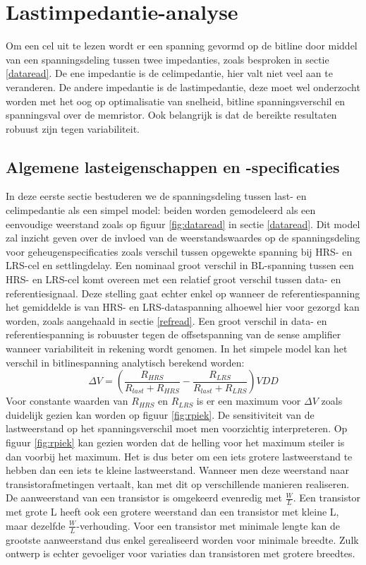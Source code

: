 \chapter{Lastimpedantie-analyse}
\label{loadanalysis}
Om een cel uit te lezen wordt er een spanning gevormd op de bitline door middel van een spanningsdeling tussen twee impedanties, zoals besproken in sectie \ref{dataread}. De ene impedantie is de celimpedantie, hier valt niet veel aan te veranderen. De andere impedantie is de lastimpedantie, deze moet wel onderzocht worden met het oog op optimalisatie van snelheid, bitline spanningsverschil en spanningsval over de memristor.
Ook belangrijk is dat de bereikte resultaten robuust zijn tegen variabiliteit.

\section{Algemene lasteigenschappen en -specificaties}\label{sec:simplemodel}
In deze eerste sectie bestuderen we de spanningsdeling tussen last- en celimpedantie als een simpel model: beiden worden gemodeleerd als een eenvoudige weerstand zoals op figuur \ref{fig:dataread} in sectie \ref{dataread}. Dit model zal inzicht geven over de invloed van de weerstandswaardes op de spanningsdeling voor geheugenspecificaties zoals verschil tussen opgewekte spanning bij HRS- en LRS-cel en settlingdelay.
Een nominaal groot verschil in BL-spanning tussen een HRS- en LRS-cel komt overeen met een relatief groot verschil tussen data- en referentiesignaal. Deze stelling gaat echter enkel op wanneer de referentiespanning het gemiddelde is van HRS- en LRS-dataspanning alhoewel hier voor gezorgd kan worden, zoals aangehaald in sectie \ref{refread}. Een groot verschil in data- en referentiespanning is robuuster tegen de offsetspanning van de sense amplifier wanneer variabiliteit in rekening wordt genomen. In het simpele model kan het verschil in bitlinespanning analytisch berekend worden:
\begin{equation}
 \Delta V = (\frac{R_{HRS}}{R_{last}+R_{HRS}} - \frac{R_{LRS}}{R_{last}+R_{LRS}})VDD
\end{equation} 
Voor constante waarden van $R_{HRS}$ en $R_{LRS}$ is er een maximum voor $ \Delta V$ zoals duidelijk gezien kan worden op figuur \ref{fig:rpiek}. De sensitiviteit van de lastweerstand op het spanningsverschil moet men voorzichtig interpreteren. Op figuur \ref{fig:rpiek} kan gezien worden dat de helling voor het maximum steiler is dan voorbij het maximum. Het is dus beter om een iets grotere lastweerstand te hebben dan een iets te kleine lastweerstand. Wanneer men deze weerstand naar transistorafmetingen vertaalt, kan met dit op verschillende manieren realiseren. De aanweerstand van een transistor is omgekeerd evenredig met $\frac{W}{L}$. Een transistor met grote L heeft ook een grotere weerstand dan een transistor met kleine L, maar dezelfde $\frac{W}{L}$-verhouding. Voor een transistor met minimale lengte kan de grootste aanweerstand dus enkel gerealiseerd worden voor minimale breedte. Zulk ontwerp is echter gevoeliger voor variaties dan transistoren met grotere breedtes.\\

